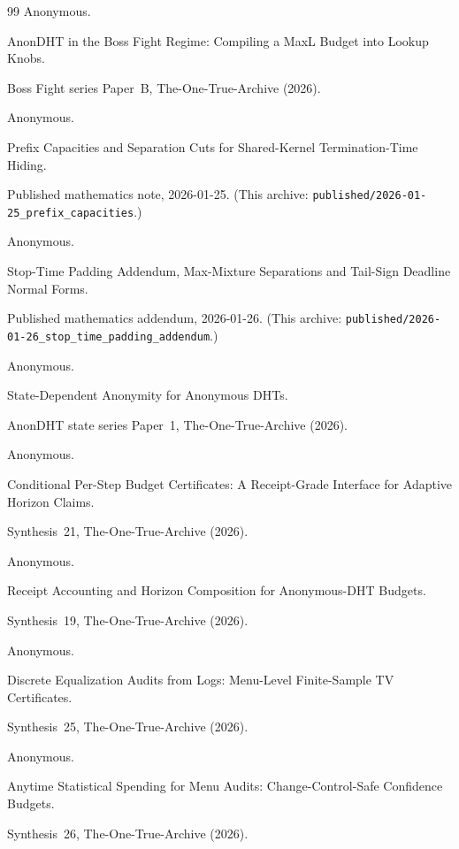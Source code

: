 \documentclass[11pt]{article}
\begin{document}
\begin{thebibliography}{99}
Anonymous.

\newblock AnonDHT in the Boss Fight Regime: Compiling a MaxL Budget into Lookup Knobs.

\newblock Boss Fight series Paper~B, The-One-True-Archive (2026).


Anonymous.

\newblock Prefix Capacities and Separation Cuts for Shared-Kernel Termination-Time Hiding.

\newblock Published mathematics note, 2026-01-25. (This archive: \texttt{published/2026-01-25\_prefix\_capacities}.)

Anonymous.

\newblock Stop-Time Padding Addendum, Max-Mixture Separations and Tail-Sign Deadline Normal Forms.

\newblock Published mathematics addendum, 2026-01-26. (This archive: \texttt{published/2026-01-26\_stop\_time\_padding\_addendum}.)

Anonymous.

\newblock State-Dependent Anonymity for Anonymous DHTs.

\newblock AnonDHT state series Paper~1, The-One-True-Archive (2026).

Anonymous.

\newblock Conditional Per-Step Budget Certificates: A Receipt-Grade Interface for Adaptive Horizon Claims.

\newblock Synthesis~21, The-One-True-Archive (2026).

Anonymous.

\newblock Receipt Accounting and Horizon Composition for Anonymous-DHT Budgets.

\newblock Synthesis~19, The-One-True-Archive (2026).


Anonymous.

\newblock Discrete Equalization Audits from Logs: Menu-Level Finite-Sample TV Certificates.

\newblock Synthesis~25, The-One-True-Archive (2026).

Anonymous.

\newblock Anytime Statistical Spending for Menu Audits: Change-Control-Safe Confidence Budgets.

\newblock Synthesis~26, The-One-True-Archive (2026).


\end{thebibliography}
\end{document}
